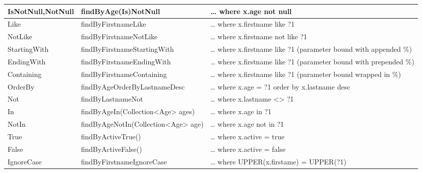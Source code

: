 \begin{longtable}{| p{.20\linewidth} | p{.30\linewidth} | p{.50\linewidth } |}
			\hline
			IsNotNull,NotNull &	findByAge(Is)NotNull	& … where x.age not null \\
			\hline
			Like &	findByFirstnameLike	& … where x.firstname like ?1 \\
			\hline
			NotLike &	findByFirstnameNotLike	& … where x.firstname not like ?1 \\
			\hline
			StartingWith &	findByFirstnameStartingWith	& … where x.firstname like ?1 (parameter bound with appended \%) \\
			\hline
			EndingWith &	findByFirstnameEndingWith	& … where x.firstname like ?1 (parameter bound with prepended \%) \\
			\hline
			Containing &	findByFirstnameContaining	& … where x.firstname like ?1 (parameter bound wrapped in \%) \\
			\hline
			OrderBy &	findByAgeOrderByLastnameDesc	& … where x.age = ?1 order by x.lastname desc \\
			\hline
			Not &	findByLastnameNot	& … where x.lastname <> ?1 \\
			\hline
			In &	findByAgeIn(Collection<Age> \linebreak ages)	& … where x.age in ?1 \\
			\hline
			NotIn &	findByAgeNotIn(Collection<Age> \linebreak age)	& … where x.age not in ?1 \\
			\hline
			True &	findByActiveTrue()	& … where x.active = true \\
			\hline
			False &	findByActiveFalse()	& … where x.active = false \\
			\hline
			IgnoreCase &	findByFirstnameIgnoreCase	& … where UPPER(x.firstame) = UPPER(?1) \\
			\hline
	\end{longtable}

